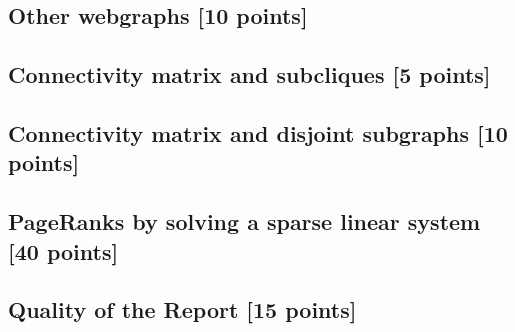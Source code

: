 \documentclass[unicode,11pt,a4paper,oneside,numbers=endperiod,openany]{scrartcl}
\begin{document}
\subsection{Other webgraphs [10 points]}

\subsection{Connectivity matrix and subcliques [5 points]}

\subsection{Connectivity matrix and disjoint subgraphs [10 points]}

\subsection{PageRanks by solving a sparse linear system [40 points]}

\subsection{Quality of the Report [15 points]}
\end{document}
